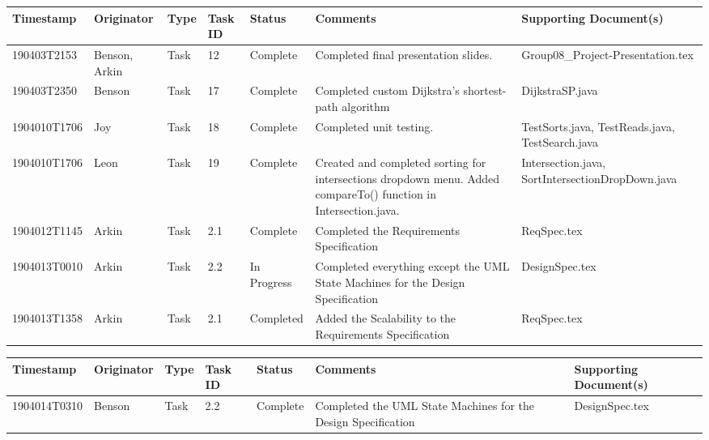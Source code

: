 \documentclass[12pt]{article}
\begin{document}
\begin{center}
    \begin{tabular}{| P{2.5cm} | P{2.2cm} | P{1.4cm} | P{0.9cm} | P{1.9cm} | P{2.8cm} | P{3cm} |}
        \hline
        \textbf{Timestamp} & \textbf{Originator} & \textbf{Type} 
        & \textbf{Task ID} & \textbf{Status} & \textbf{Comments} 
        & \textbf{Supporting Document(s)}\\
        \hline
        190403T2153 & Benson, Arkin & Task & 12 & Complete & Completed final presentation slides. & Group08\_Project-Presentation.tex \\
        \hline
        190403T2350 & Benson & Task & 17 & Complete & Completed custom Dijkstra's shortest-path algorithm & DijkstraSP.java \\
        \hline
        1904010T1706 & Joy & Task & 18 & Complete & Completed unit testing. & TestSorts.java, TestReads.java, TestSearch.java \\
        \hline
        1904010T1706 & Leon & Task & 19 & Complete & Created and completed sorting for intersections dropdown menu. Added compareTo() function in Intersection.java.
        & Intersection.java, SortIntersectionDropDown.java \\
        \hline
        1904012T1145 & Arkin & Task & 2.1 & Complete & Completed the Requirements Specification & ReqSpec.tex \\
        \hline
        1904013T0010 & Arkin & Task & 2.2 & In Progress & Completed everything except the UML State Machines for the Design Specification & DesignSpec.tex \\
        \hline
        1904013T1358 & Arkin & Task & 2.1 & Completed & Added the Scalability to the Requirements Specification & ReqSpec.tex \\
        \hline
    \end{tabular}
    
    \begin{tabular}{| P{2.5cm} | P{2.2cm} | P{1.4cm} | P{0.9cm} | P{1.9cm} | P{2.8cm} | P{3cm} |}
        \hline
        \textbf{Timestamp} & \textbf{Originator} & \textbf{Type} 
        & \textbf{Task ID} & \textbf{Status} & \textbf{Comments} 
        & \textbf{Supporting Document(s)}\\
        \hline
        1904014T0310 & Benson & Task & 2.2 & Complete & Completed the UML State Machines for the Design Specification & DesignSpec.tex \\
        \hline
    \end{tabular}
    \end{center}
\end{document}
